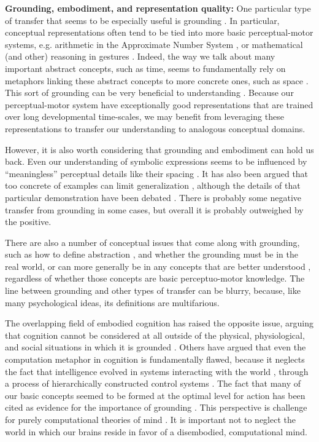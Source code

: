 \textbf{Grounding, embodiment, and representation quality:} One particular type of transfer that seems to be especially useful is grounding \citep{Barsalou2007}. In particular, conceptual representations often tend to be tied into more basic perceptual-motor systems, e.g. arithmetic in the Approximate Number System \citep{Park2013}, or mathematical (and other) reasoning in gestures \citep{Goldin-Meadow1993, Goldin-Meadow1999}. Indeed, the way we talk about many important abstract concepts, such as time, seems to fundamentally rely on metaphors linking these abstract concepts to more concrete ones, such as space \citep{Lakoff1980}. This sort of grounding can be very beneficial to understanding \citep{Nathan2008, Schwartz2015, Wakefield2018}. Because our perceptual-motor system have exceptionally good representations that are trained over long developmental time-scales, we may benefit from leveraging these representations to transfer our understanding to analogous conceptual domains. \par 
However, it is also worth considering that grounding and embodiment can hold us back. Even our understanding of symbolic expressions seems to be influenced by ``meaningless'' perceptual details like their spacing \citep{Landy2007}. It has also been argued that too concrete of examples can limit generalization \citep{Kaminski2008}, although the details of that particular demonstration have been debated \citep{DeBock2011, Lampinen2017b}. There is probably some negative transfer from grounding in some cases, but overall it is probably outweighed by the positive. \par
There are also a number of conceptual issues that come along with grounding, such as how to define abstraction \citep{Dove2016}, and whether the grounding must be in the real world, or can more generally be in any concepts that are better understood \citep{Wilensky1991}, regardless of whether those concepts are basic perceptuo-motor knowledge. The line between grounding and other types of transfer can be blurry, because, like many psychological ideas, its definitions are multifarious. \par 
The overlapping field of embodied cognition has raised the opposite issue, arguing that cognition cannot be considered at all outside of the physical, physiological, and social situations in which it is grounded \citep{Anderson2003}. Others have argued that even the computation metaphor in cognition is fundamentally flawed, because it neglects the fact that intelligence evolved in systems interacting with the world \citep{Cisek1999}, through a process of hierarchically constructed control systems \citep{Cisek2019}. The fact that many of our basic concepts seemed to be formed at the optimal level for action \citep{Rosch1976} has been cited as evidence for the importance of grounding \citep{Lakoff1999}. This perspective is challenge for purely computational theories of mind \citep{fodor2001mind}. It is important not to neglect the world in which our brains reside in favor of a disembodied, computational mind. \par

